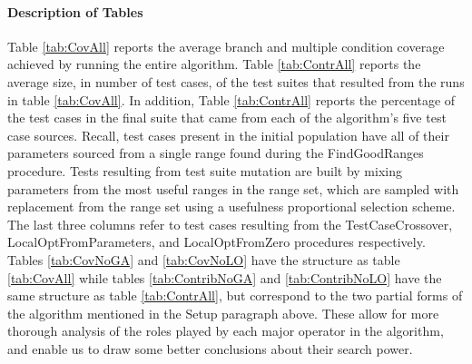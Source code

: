 \documentclass[runningheads]{llncs}
\begin{document}
\paragraph{Description of Tables} Table \ref{tab:CovAll} reports the average branch and multiple condition coverage achieved by running the entire algorithm. Table \ref{tab:ContrAll} reports the average size, in number of test cases, of the test suites that resulted from the runs in table \ref{tab:CovAll}. In addition, Table \ref{tab:ContrAll} reports the percentage of the test cases in the final suite that came from each of the algorithm's five test case sources. Recall, test cases present in the initial population have all of their parameters sourced from a single range found during the FindGoodRanges procedure. Tests resulting from test suite mutation are built by mixing parameters from the most useful ranges in the range set, which are sampled with replacement from the range set using a usefulness proportional selection scheme. The last three columns refer to test cases resulting from the TestCaseCrossover, LocalOptFromParameters, and LocalOptFromZero procedures respectively. Tables \ref{tab:CovNoGA} and \ref{tab:CovNoLO} have the structure as table \ref{tab:CovAll} while tables \ref{tab:ContribNoGA} and \ref{tab:ContribNoLO} have the same structure as table \ref{tab:ContrAll}, but correspond to the two partial forms of the algorithm mentioned in the Setup paragraph above. These allow for more thorough analysis of the roles played by each major operator in the algorithm, and enable us to draw some better conclusions about their search power.
\end{document}
